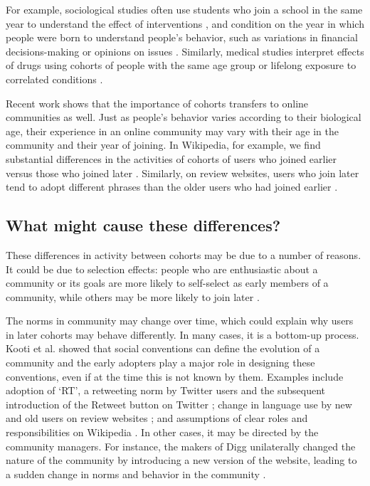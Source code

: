 For example, sociological studies often use students who join a school in the same year to understand the effect of interventions \cite{Goyette2008,Alexander2012}, and condition on the year in which people were born to understand people's  behavior, such as variations in financial decisions-making \cite{Attanasio1993} or opinions on issues \cite{Firebaugh1988,Jennings1996}. Similarly, medical studies interpret effects of drugs using cohorts of people with the same age group or lifelong exposure to correlated conditions \cite{Howartz1996,Davis2010}.  

Recent work shows that the importance of cohorts transfers to online communities as well. Just as people's behavior varies according to their biological age, their experience in an online community may vary with their age in the community and their year of joining. In Wikipedia, for example, we find substantial differences in the activities of cohorts of users who joined earlier versus those who joined later \cite{Welser2011}. Similarly, on review websites, users who join later tend to adopt different phrases than the older users who had joined earlier \cite{Danescu-niculescu-mizil2013}.

\subsection{What might cause these differences?}

These differences in activity between cohorts may be due to a number of reasons. It could be due to selection effects: people who are enthusiastic about a community or its goals are more likely to self-select as early members of a community, while others may be more likely to join later \cite{Li2008}. 

The norms in community may change over time, which could explain why users in later cohorts may behave differently. In many cases, it is a bottom-up process. Kooti et al. \cite{Kooti2010} showed that social conventions can define the evolution of a community and the early adopters play a major role in designing these conventions, even if at the time this is not known by them. Examples include adoption of `RT', a retweeting norm by Twitter users and the subsequent introduction of the Retweet button on Twitter \cite{Kooti2010}; change in language use by new and old users on review websites \cite{Danescu-niculescu-mizil2013}; and assumptions of clear roles and responsibilities on Wikipedia \cite{Kittur2007a}. In other cases, it may be directed by the community managers. For instance, the makers of Digg unilaterally changed the nature of the community by introducing a new version of the website, leading to a sudden change in norms and behavior in the community \cite{Ingram2014,Lardinois2014}. 

